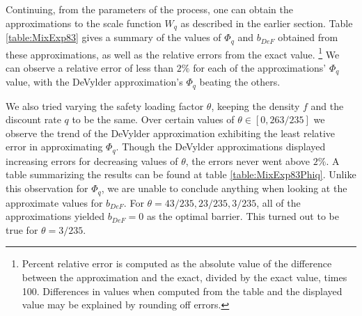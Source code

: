 Continuing, from the parameters of the process, one can obtain the approximations to the scale function $W_q$ as described in the earlier section. Table \ref{table:MixExp83} gives a summary of the values of $\Phi_q$ and $b_{DeF}$ obtained from these approximations, as well as the relative errors %
from the exact value. \footnote{Percent relative error is computed as the absolute value of the difference between the approximation and the exact, divided by the exact value, times 100. Differences in values when computed from the table and the displayed value may be explained by rounding off errors.}
We can observe a relative error  of less than $2\%$ for each of the approximations' $\Phi_q$ value, with the DeVylder approximation's $\Phi_q$ beating the others. %

We also tried varying the safety loading factor $\theta$, keeping the density $f$ and the discount rate $q$ to be the same. Over certain values of $\theta \in [0, 263/235]$ we observe the trend of the DeVylder approximation exhibiting the least relative error  in approximating $\Phi_q$. Though the DeVylder approximations displayed increasing errors for decreasing values of $\theta$, the errors never went above $2\%$. A table summarizing the results can be found at table \ref{table:MixExp83Phiq}. Unlike this observation for $\Phi_q$, we are unable to conclude anything when looking at the approximate values for $b_{DeF}$. For $\theta=43/235, 23/235, 3/235$, all of the approximations yielded $b_{DeF}=0$ as the optimal barrier. This turned out to be true for $\theta=3/235$.
\eeR

